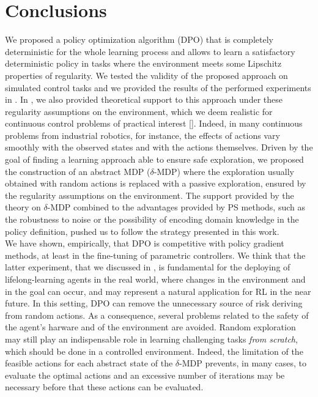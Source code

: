 \chapter{Conclusions} \label{chap:conc}
We proposed a policy optimization algorithm (\ac{DPO}) that is completely deterministic for the whole learning process and allows to learn a satisfactory deterministic policy in tasks where the environment meets some Lipschitz properties of regularity. We tested the validity of the proposed approach on simulated control tasks and we provided the results of the performed experiments in . In , we also provided theoretical support to this approach under these regularity assumptions on the environment, which we deem realistic for continuous control problems of practical interest [\cite{kober2013reinforcement}]. Indeed, in many continuous problems from industrial robotics, for instance, the effects of actions vary smoothly with the observed states and with the actions themselves. Driven by the goal of finding a learning approach able to ensure safe exploration, we proposed the construction of an abstract \ac{MDP} ($\delta$-\ac{MDP}) where the exploration usually obtained with random actions is replaced with a passive exploration, ensured by the regularity assumptions on the environment. The support provided by the theory on $\delta$-\ac{MDP} combined to the advantages provided by \ac{PS} methods, such as the robustness to noise or the possibility of encoding domain knowledge in the policy definition, pushed us to follow the strategy presented in this work.\\
\newline
We have shown, empirically, that \ac{DPO} is competitive with policy gradient methods, at least in the fine-tuning of parametric controllers. We think that the latter experiment, that we discussed in , is fundamental for the deploying of lifelong-learning agents in the real world, where changes in the environment and in the goal can occur, and may represent a natural application for \ac{RL} in the near future. In this setting, \ac{DPO} can remove the unnecessary source of risk deriving from random actions. As a consequence, several problems related to the safety of the agent's harware and of the environment are avoided. Random exploration may still play an indispensable role in learning challenging tasks \textit{from scratch}, which should be done in a controlled environment. Indeed, the limitation of the feasible actions for each abstract state of the $\delta$-\ac{MDP} prevents, in many cases, to evaluate the optimal actions and an excessive number of iterations may be necessary before that these actions can be evaluated.\\
